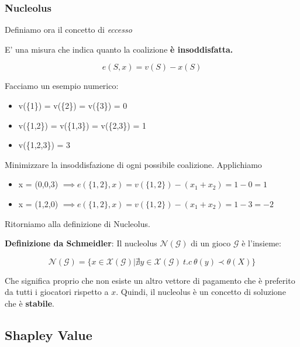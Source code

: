 \subsubsection{Nucleolus}

Definiamo ora il concetto di \textit{eccesso}

\begin{definition}[Eccesso]
    E' una misura che indica quanto la coalizione \textbf{è insoddisfatta.}

    \begin{equation}
        e(S,x) = v(S) - x(S)
    \end{equation}
\end{definition}

Facciamo un esempio numerico:

\begin{itemize}
    \item v(\{1\}) = v(\{2\}) = v(\{3\}) = 0
    \item v(\{1,2\}) = v(\{1,3\}) = v(\{2,3\}) = 1
    \item v(\{1,2,3\}) = 3
\end{itemize}

Minimizzare la insoddisfazione di ogni possibile coalizione. Applichiamo

\begin{itemize}
    \item x = (0,0,3) $\implies e(\{1,2\}, x) = v(\{1,2\}) - (x_1+x_2) = 1-0=1$
    \item x = (1,2,0) $\implies e(\{1,2\}, x) = v(\{1,2\}) - (x_1+x_2) = 1-3=-2$
\end{itemize}

Ritorniamo alla definizione di Nucleolus.

\textbf{Definizione da Schmeidler}: Il nucleolus $\mathcal{N}(\mathcal{G})$ di un gioco $\mathcal{G}$ è l'insieme:

\[
    \mathcal{N}(\mathcal{G}) = \{x \in \mathcal{X}(\mathcal{G})|\nexists y \in \mathcal{X}(\mathcal{G}) \ t.c\ \theta(y) \prec  \theta(X) \}
\]

Che significa proprio che non esiste un altro vettore di pagamento che è
preferito da tutti i giocatori rispetto a $x$. Quindi, il nucleolus è un
concetto di soluzione che è \textbf{stabile}.

\subsection{Shapley Value}

